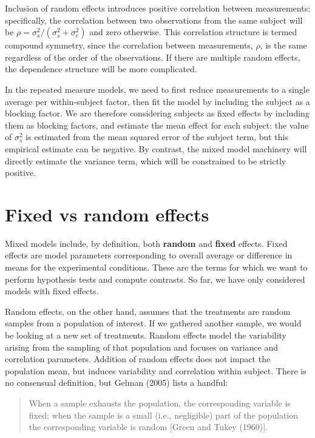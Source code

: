 \documentclass[
  11pt,
  letterpaper,
]{scrbook}
\theoremstyle{definition}
\theoremstyle{definition}
\theoremstyle{remark}
\begin{document}
Inclusion of random effects introduces positive correlation between
measurements: specifically, the correlation between two observations
from the same subject will be
\(\rho=\sigma^2_s/(\sigma^2_s+\sigma^2_e)\) and zero otherwise. This
correlation structure is termed compound symmetry, since the correlation
between measurements, \(\rho\), is the same regardless of the order of
the observations. If there are multiple random effects, the dependence
structure will be more complicated.

In the repeated measure models, we need to first reduce measurements to
a single average per within-subject factor, then fit the model by
including the subject as a blocking factor. We are therefore considering
subjects as fixed effects by including them as blocking factors, and
estimate the mean effect for each subject: the value of \(\sigma^2_s\)
is estimated from the mean squared error of the subject term, but this
empirical estimate can be negative. By contrast, the mixed model
machinery will directly estimate the variance term, which will be
constrained to be strictly positive.

\section{Fixed vs random effects}\label{fixed-vs-random-effects}

Mixed models include, by definition, both \textbf{random} and
\textbf{fixed} effects. Fixed effects are model parameters corresponding
to overall average or difference in means for the experimental
conditions. These are the terms for which we want to perform hypothesis
tests and compute contrasts. So far, we have only considered models with
fixed effects.

Random effects, on the other hand, assumes that the treatments are
random samples from a population of interest. If we gathered another
sample, we would be looking at a new set of treatments. Random effects
model the variability arising from the sampling of that population and
focuses on variance and correlation parameters. Addition of random
effects does not impact the population mean, but induces variability and
correlation within subject. There is no consensual definition, but
Gelman (2005) lists a handful:

\begin{quote}
When a sample exhausts the population, the corresponding variable is
fixed; when the sample is a small (i.e., negligible) part of the
population the corresponding variable is random {[}Green and Tukey
(1960){]}.
\end{quote}
\end{document}
